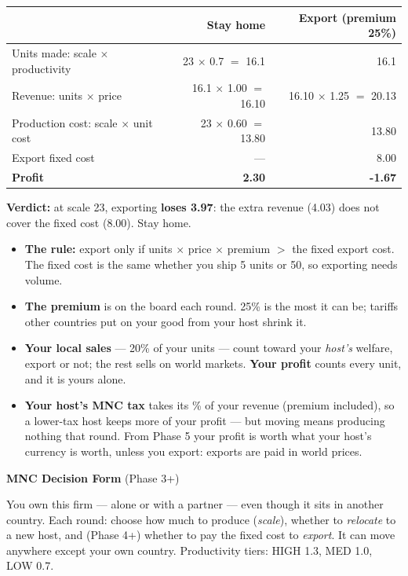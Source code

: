 \documentclass[11pt]{article}
\begin{document}
\vspace{6pt}
\begin{center}
\renewcommand{\arraystretch}{1.25}
\begin{tabular}{lrr}
\toprule
 & \textbf{Stay home} & \textbf{Export} (premium 25\%) \\
\midrule
Units made: scale $\times$ productivity & 23 $\times$ 0.7 $=$ 16.1 & 16.1 \\
Revenue: units $\times$ price & 16.1 $\times$ 1.00 $=$ 16.10
  & 16.10 $\times$ 1.25 $=$ 20.13 \\
Production cost: scale $\times$ unit cost & 23 $\times$ 0.60 $=$ 13.80 & 13.80 \\
Export fixed cost & --- & 8.00 \\
\midrule
\textbf{Profit} & \textbf{2.30} & \textbf{-1.67} \\
\bottomrule
\end{tabular}
\end{center}

\textbf{Verdict:} at scale 23, exporting \textbf{loses 3.97}: the extra revenue (4.03) does not cover the fixed cost (8.00). Stay home.

\vspace{4pt}
\begin{itemize}[nosep,leftmargin=1.2em]
  \item \textbf{The rule:} export only if units $\times$ price $\times$ premium
    $>$ the fixed export cost. The fixed cost is the same whether you ship 5 units
    or 50, so exporting needs volume.
  \item \textbf{The premium} is on the board each round. 25\% is the most it
    can be; tariffs other countries put on your good from your host shrink it.
  \item \textbf{Your local sales} --- 20\% of your units --- count toward your
    \emph{host's} welfare, export or not; the rest sells on world markets.
    \textbf{Your profit} counts every unit, and it is yours alone.
  \item \textbf{Your host's MNC tax} takes its \% of your revenue (premium
    included), so a lower-tax host keeps more of your profit --- but moving
    means producing nothing that round. From Phase 5 your profit is worth what
    your host's currency is worth, unless you export: exports are paid in world
    prices.
\end{itemize}

\newpage
{\large\bfseries MNC Decision Form} \hfill (Phase 3+)\par
You own this firm --- alone or with a partner --- even though it sits in another country. Each round: choose how much to produce (\emph{scale}), whether to \emph{relocate} to a new host, and (Phase 4+) whether to pay the fixed cost to \emph{export}. It can move anywhere except your own country. Productivity tiers: HIGH 1.3, MED 1.0, LOW 0.7.
\vspace{6pt}
\end{document}
